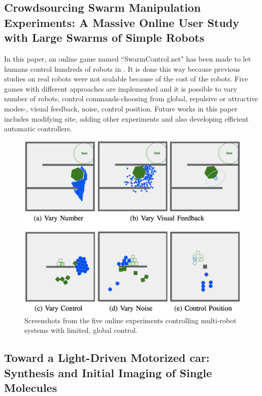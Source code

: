 \documentclass[letterpaper, 10 pt, conference]{ieeeconf}
\begin{document}
\subsection{Crowdsourcing Swarm Manipulation Experiments: A Massive Online User Study with Large Swarms of Simple Robots}

In this paper, an online game named ``SwarmControl.net" has been made to let humans control hundreds of robots in \cite{swarmcontrol2013}. It is done this way because previous studies on real robots were not scalable because of the cost of the robots. Five games with different approaches are implemented and it is possible to vary number of robots, control commands-choosing from global, repulsive or attractive modes-, visual feedback, noise, control position. Future works in this paper includes modifying site, adding other experiments and also developing efficient automatic controllers.
\begin{figure}[h]
\begin{center}
\includegraphics[width=\columnwidth]{SwarmBecker.png}
\caption{Screenshots from the five online experiments controlling multi-robot systems with limited, global control\cite{swarmcontrol2013}.
\label{fig:swarmcontrol.net}}
\end{center}
\end{figure} 

\subsection{Toward a Light-Driven Motorized 
 car: Synthesis and Initial Imaging of Single Molecules}
\end{document}
